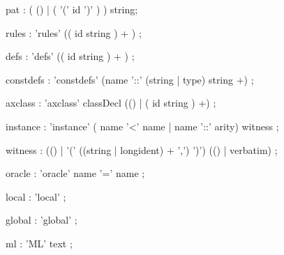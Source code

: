 \begin{rail}
pat : ( () | ( '(' id ')' ) ) string;

rules : 'rules' (( id string ) + )
      ;

defs : 'defs' (( id string ) + )
     ;

constdefs : 'constdefs' (name '::' (string | type) string +)
          ;

axclass : 'axclass' classDecl (() | ( id string ) +)
        ;

instance : 'instance' ( name '<' name | name '::' arity) witness
         ;

witness : (() | '(' ((string | longident) + ',') ')') (() | verbatim)
        ;

oracle : 'oracle' name '=' name
       ;

local : 'local'
       ;

global : 'global'
       ;

ml : 'ML' text
   ;

\end{rail}

